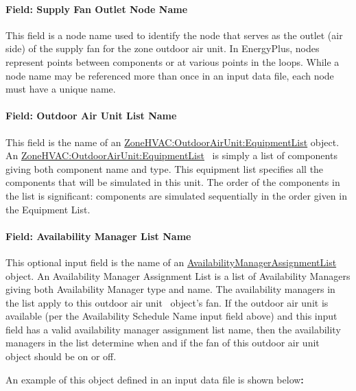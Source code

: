 \paragraph{Field: Supply Fan Outlet Node Name}\label{field-supply-fan-outlet-node-name}

This field is a node name used to identify the node that serves as the outlet (air side) of the supply fan for the zone outdoor air unit. In EnergyPlus, nodes represent points between components or at various points in the loops. While a node name may be referenced more than once in an input data file, each node must have a unique name.

\paragraph{Field: Outdoor Air Unit List Name}\label{field-outdoor-air-unit-list-name}

This field is the name of an \hyperref[zonehvacoutdoorairunitequipmentlist]{ZoneHVAC:OutdoorAirUnit:EquipmentList} object. An \hyperref[zonehvacoutdoorairunitequipmentlist]{ZoneHVAC:OutdoorAirUnit:EquipmentList} ~is simply a list of components giving both component name and type. This equipment list specifies all the components that will be simulated in this unit. The order of the components in the list is significant: components are simulated sequentially in the order given in the Equipment List.

\paragraph{Field: Availability Manager List Name}\label{field-availability-manager-list-name-4}

This optional input field is the name of an \hyperref[availabilitymanagerassignmentlist]{AvailabilityManagerAssignmentList} object. An Availability Manager Assignment List is a list of Availability Managers giving both Availability Manager type and name. The availability managers in the list apply to this outdoor air unit~ object's fan. If the outdoor air unit is available (per the Availability Schedule Name input field above) and this input field has a valid availability manager assignment list name, then the availability managers in the list determine when and if the fan of this outdoor air unit~ object should be on or off.

An example of this object defined in an input data file is shown below\textbf{:}

